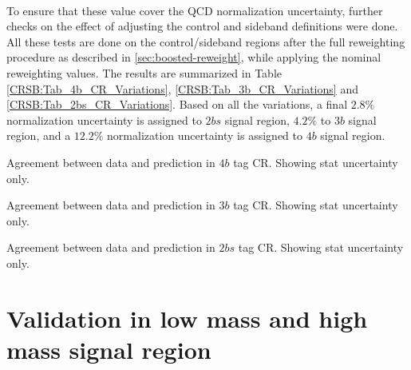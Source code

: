 \paragraph{}
To ensure that these value cover the QCD normalization uncertainty, further checks on the effect of adjusting the control and sideband definitions were done. 
All these tests are done on the control/sideband regions after the full reweighting procedure as described in \ref{sec:boosted-reweight}, while applying the nominal reweighting values.
The results are summarized in Table \ref{CRSB:Tab_4b_CR_Variations}, \ref{CRSB:Tab_3b_CR_Variations} and \ref{CRSB:Tab_2bs_CR_Variations}. 
Based on all the variations, a final $2.8\%$ normalization uncertainty is assigned to $2bs$ signal region, $4.2\%$ to $3b$ signal region, and a $12.2\%$ normalization uncertainty is assigned to $4b$ signal region.

\begin{table}[htb!]
\begin{center}

\end{center}
\caption{Agreement between data and prediction in $4b$ tag CR. Showing stat uncertainty only.}
\label{CRSB:Tab_4b_CR_Variations}
\end{table}

\begin{table}[htb!]
\begin{center}

\end{center}
\caption{Agreement between data and prediction in $3b$ tag CR. Showing stat uncertainty only.}
\label{CRSB:Tab_3b_CR_Variations}
\end{table}
\begin{table}[htb!]
\begin{center}

\end{center}
\caption{Agreement between data and prediction in $2bs$ tag CR. Showing stat uncertainty only.}
\label{CRSB:Tab_2bs_CR_Variations}
\end{table}


\section{Validation in low mass and high mass signal region}
\label{sec:boosted-ZZ-Rehearsal}

